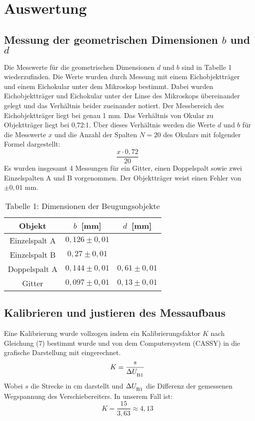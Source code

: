 \documentclass[11pt]{article}
\begin{document}
\section{Auswertung}
\subsection{Messung der geometrischen Dimensionen $b$ und $d$}
Die Messwerte für die geometrischen Dimensionen $d$ und $b$ sind in Tabelle 1 wiederzufinden. Die Werte wurden durch Messung mit einem Eichobjektträger und einem Eichokular unter dem Mikroskop bestimmt. Dabei wurden Eichobjektträger und Eichokular unter der Linse des Mikroskops übereinander gelegt und das Verhältnis beider zueinander notiert. Der Messbereich des Eichobjektträger liegt bei genau 1 mm. Das Verhältnis von Okular zu Objektträger liegt bei 0,72:1. Über dieses Verhältnis werden die Werte $d$ und $b$ für die Messwerte $x$ und die Anzahl der Spalten $N=20$ des Okulars mit folgender Formel dargestellt: 
	\begin{equation}
	\frac{x\cdot 0,72}{20}
	\end{equation} 
Es wurden insgesamt 4 Messungen für ein Gitter, einen Doppelspalt sowie zwei Einzelspalten A und B vorgenommen. Der Objektträger weist einen Fehler von $\pm 0,01$ mm.
\begin{table}
	\centering
	\begin{tabular}{c|cc}
		Objekt & $b$\ [mm] & $d$\ [mm]\\
		\hline
		Einzelspalt A & $0,126\pm 0,01$& \\
		Einzelspalt B & $0,27\pm 0,01$& \\
		Doppelspalt A & $0,144\pm 0,01$  & $0,61\pm 0,01$\\
		Gitter & $0,097\pm 0,01$  & $0,13\pm 0,01$\\
	\end{tabular}
	\caption*{Tabelle 1: Dimensionen der Beugungsobjekte}
\end{table}

\subsection{Kalibrieren und justieren des Messaufbaus}
Eine Kalibrierung wurde vollzogen indem ein Kalibrierungsfaktor $K$ nach Gleichung (7) bestimmt wurde und von dem Computersystem (CASSY) in die grafische Darstellung mit eingerechnet.
	\begin{equation}
	K=\frac{s}{\Delta U_\textsubscript{B1}}
	\end{equation}
Wobei $s$ die Strecke in cm darstellt und $\Delta U_\textsubscript{B1}$ die Differenz der gemessenen Wegspannung des Verschiebereiters. In unserem Fall ist: $$K=\frac{15}{3,63}\approx 4,13$$
\end{document}
